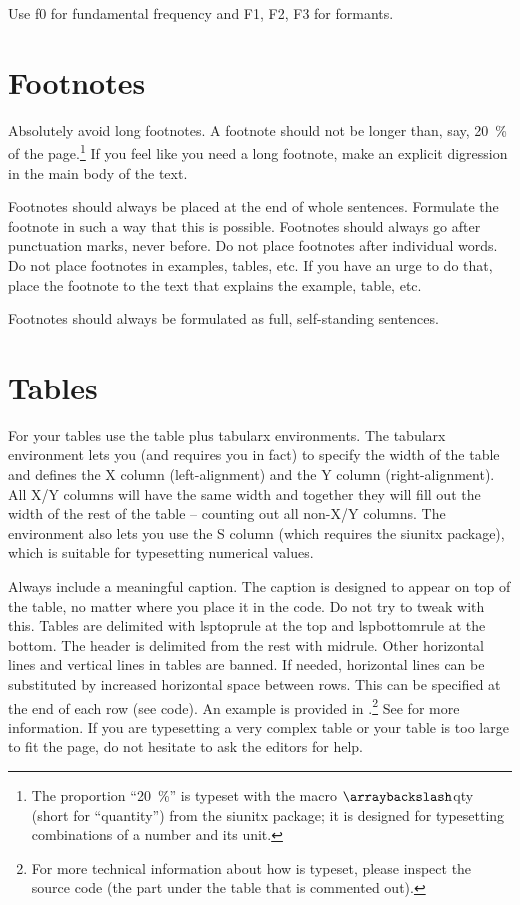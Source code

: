 Use f0 for fundamental frequency and F1, F2, F3 for formants.


\section{Footnotes}\label{sim:sec:footnotes}

Absolutely avoid long footnotes. A footnote should not be longer than, say, \qty{20}{\percent} of the page.\footnote{The proportion ``\qty{20}{\percent}'' is typeset with the macro $\arraybackslash$qty (short for ``quantity'') from the siunitx package; it is designed for typesetting combinations of a number and its unit.} If you feel like you need a long footnote, make an explicit digression in the main body of the text.

Footnotes should always be placed at the end of whole sentences. Formulate the footnote in such a way that this is possible. Footnotes should always go after punctuation marks, never before. Do not place footnotes after individual words. Do not place footnotes in examples, tables, etc. If you have an urge to do that, place the footnote to the text that explains the example, table, etc.

Footnotes should always be formulated as full, self-standing sentences.

\section{Tables}

For your tables use the table plus tabularx environments. The tabularx environment lets you (and requires you in fact) to specify the width of the table and defines the X column (left-alignment) and the Y column (right-alignment). All X/Y columns will have the same width and together they will fill out the width of the rest of the table -- counting out all non-X/Y columns. The environment also lets you use the S column (which requires the siunitx package), which is suitable for typesetting numerical values.

Always include a meaningful caption. The caption is designed to appear on top of the table, no matter where you place it in the code. Do not try to tweak with this. Tables are delimited with lsptoprule at the top and lspbottomrule at the bottom. The header is delimited from the rest with midrule. Other horizontal lines and vertical lines in tables are banned. If needed, horizontal lines can be substituted by increased horizontal space between rows. This can be specified at the end of each row (see code). An example is provided in .\footnote{For more technical information about how  is typeset, please inspect the source code (the part under the table that is commented out).} See \citet{Nordhoff.Muller2020} for more information. If you are typesetting a very complex table or your table is too large to fit the page, do not hesitate to ask the editors for help.

